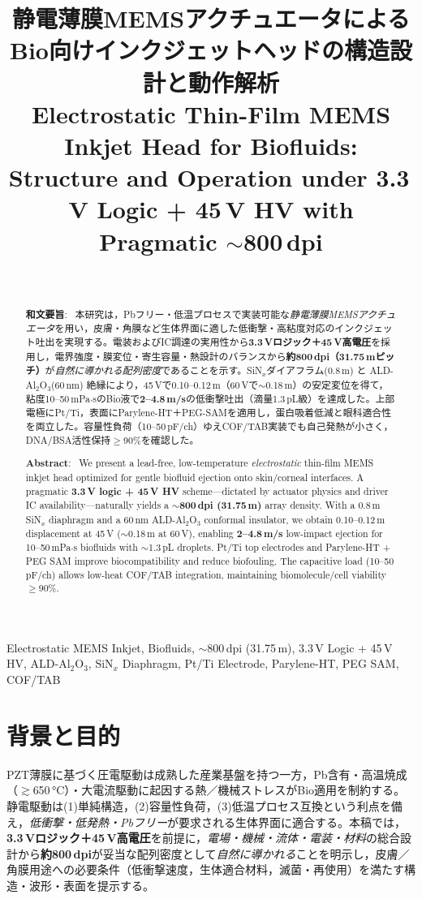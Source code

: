 \documentclass[conference]{IEEEtran}
\title{静電薄膜MEMSアクチュエータによるBio向けインクジェットヘッドの構造設計と動作解析\\
\large Electrostatic Thin-Film MEMS Inkjet Head for Biofluids: Structure and Operation under 3.3\,V Logic + 45\,V HV with Pragmatic \texorpdfstring{$\sim$}{\textasciitilde}800\,dpi}
\author{\IEEEauthorblockN{三溝 真一（Shinichi Samizo)}\\
\IEEEauthorblockA{独立系半導体研究者（元セイコーエプソン）\\
Email: \href{mailto:shin3t72@gmail.com}{shin3t72@gmail.com}\quad
GitHub: \url{https://github.com/Samizo-AITL}}}
\begin{document}
\maketitle

\begin{abstract}
\textbf{和文要旨}:~
本研究は，Pbフリー・低温プロセスで実装可能な\emph{静電薄膜MEMSアクチュエータ}を用い，皮膚・角膜など生体界面に適した低衝撃・高粘度対応のインクジェット吐出を実現する。電装およびIC調達の実用性から\textbf{3.3\,Vロジック＋45\,V高電圧}を採用し，電界強度・膜変位・寄生容量・熱設計のバランスから\textbf{約800\,dpi（31.75\,\textmu mピッチ）}が\emph{自然に導かれる配列密度}であることを示す。SiN$_x$ダイアフラム(0.8\,\textmu m) と ALD-Al$_2$O$_3$(60\,nm) 絶縁により，45\,Vで0.10--0.12\,\textmu m（60\,Vで$\sim$0.18\,\textmu m）の安定変位を得て，粘度10--50\,mPa$\cdot$sのBio液で\textbf{2--4.8\,m/s}の低衝撃吐出（滴量1.3\,pL級）を達成した。上部電極にPt/Ti，表面にParylene-HT＋PEG-SAMを適用し，蛋白吸着低減と眼科適合性を両立した。容量性負荷（10--50\,pF/ch）ゆえCOF/TAB実装でも自己発熱が小さく，DNA/BSA活性保持$\ge$90\%を確認した。

\medskip
\noindent\textbf{Abstract}:~
We present a lead-free, low-temperature \emph{electrostatic} thin-film MEMS inkjet head optimized for gentle biofluid ejection onto skin/corneal interfaces. A pragmatic \textbf{3.3\,V logic + 45\,V HV} scheme---dictated by actuator physics and driver IC availability—naturally yields a \textbf{$\sim$800\,dpi (31.75\,\textmu m)} array density. With a 0.8\,\textmu m SiN$_x$ diaphragm and a 60\,nm ALD-Al$_2$O$_3$ conformal insulator, we obtain 0.10--0.12\,\textmu m displacement at 45\,V ($\sim$0.18\,\textmu m at 60\,V), enabling \textbf{2--4.8\,m/s} low-impact ejection for 10--50\,mPa$\cdot$s biofluids with $\sim$1.3\,pL droplets. Pt/Ti top electrodes and Parylene-HT + PEG SAM improve biocompatibility and reduce biofouling. The capacitive load (10--50\,pF/ch) allows low-heat COF/TAB integration, maintaining biomolecule/cell viability $\ge$90\%.
\end{abstract}

\begin{IEEEkeywords}
Electrostatic MEMS Inkjet, Biofluids, $\sim$800\,dpi (31.75\,\textmu m), 3.3\,V Logic + 45\,V HV, ALD-Al$_2$O$_3$, SiN$_x$ Diaphragm, Pt/Ti Electrode, Parylene-HT, PEG SAM, COF/TAB
\end{IEEEkeywords}

\section{背景と目的}
PZT薄膜に基づく圧電駆動は成熟した産業基盤を持つ一方，Pb含有・高温焼成（$\gtrsim$650\,\si{\celsius}）・大電流駆動に起因する熱／機械ストレスがBio適用を制約する。静電駆動は(1)単純構造，(2)容量性負荷，(3)低温プロセス互換という利点を備え，\emph{低衝撃・低発熱・Pbフリー}が要求される生体界面に適合する。本稿では，\textbf{3.3\,Vロジック＋45\,V高電圧}を前提に，\emph{電場・機械・流体・電装・材料}の総合設計から\textbf{約800\,dpi}が妥当な配列密度として\emph{自然に導かれる}ことを明示し，皮膚／角膜用途への必要条件（低衝撃速度，生体適合材料，滅菌・再使用）を満たす構造・波形・表面を提示する。
\end{document}
